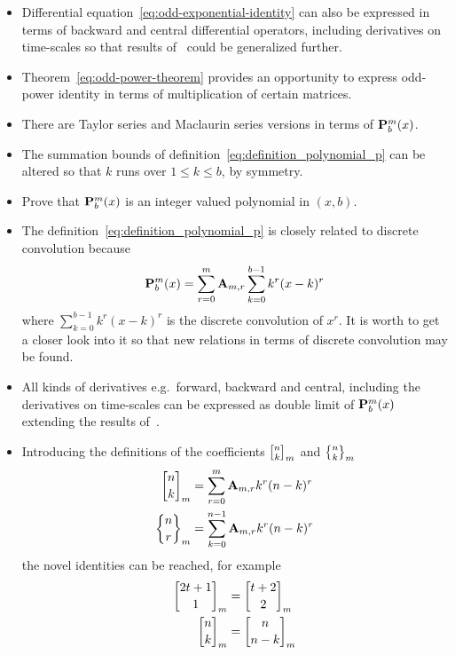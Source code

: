 \begin{itemize}
    \item Differential equation~\eqref{eq:odd-exponential-identity} can also be expressed in terms of backward
    and central differential operators, including derivatives on time-scales so that results of~\cite{kolosov2016study}
    could be generalized further.
    \item Theorem~\eqref{eq:odd-power-theorem} provides an opportunity to express odd-power identity
    in terms of multiplication of certain matrices.
    \item There are Taylor series and Maclaurin series versions in terms of ${\mathbf{P}}\sp{m} \sb{b}(x)$.
    \item The summation bounds of definition~\eqref{eq:definition_polynomial_p} can be altered so that
    $k$ runs over $1 \leq k \leq b$, by symmetry.
    \item Prove that ${\mathbf{P}}\sp{m} \sb{b}(x)$ is an integer valued polynomial in $(x,b)$.
    \item The definition~\eqref{eq:definition_polynomial_p} is closely related to discrete convolution because
    \begin{equation*}
        {\mathbf{P}}\sp{m} \sb{b}(x) = \sum_{r=0}^{m} {\mathbf{A}} \sb{m,r} \sum_{k=0}^{b-1} k^r(x-k)^r
    \end{equation*}
    where $\sum_{k=0}^{b-1} k^r(x-k)^r$ is the discrete convolution of $x^r$.
    It is worth to get a closer look into it so that new relations in terms of discrete convolution may be found.
    \item All kinds of derivatives e.g.\ forward, backward and central, including the derivatives on time-scales can be expressed
    as double limit of ${\mathbf{P}}\sp{m} \sb{b}(x)$ extending the results of~\cite{kolosov_2024_10575485}.
    \item Introducing the definitions of the coefficients
    ${n \brack k}_{m}$ and ${n \brace k}_{m}$
    \begin{align*}
        {n \brack k}_{m} &= \sum_{r=0}^{m} {\mathbf{A}} \sb{m,r} k^r (n-k)^r \\
        {n \brace r}_{m} &= \sum_{k=0}^{n-1} {\mathbf{A}} \sb{m,r} k^r (n-k)^r
    \end{align*}
    the novel identities can be reached, for example
    \begin{align*}
        \brackCoefficient{2t+1}{1}{m} &= \brackCoefficient{t+2}{2}{m} \\
        \brackCoefficient{n}{k}{m} &= \brackCoefficient{n}{n-k}{m} \\

\end{align*}
\end{itemize}
